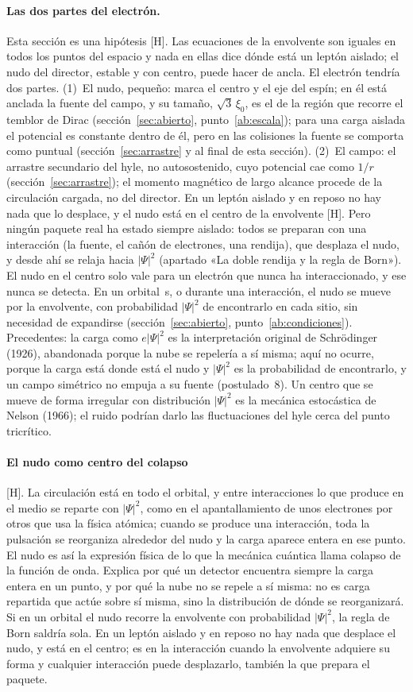 \documentclass[11pt,a4paper]{article}
\newcommand{\st}[1]{\textup{[#1]}}
\newcommand{\apartado}[1]{\paragraph{#1}}
\begin{document}
\apartado{Las dos partes del electrón.} Esta sección es una hipótesis \st{H}. Las ecuaciones de la envolvente son iguales en todos los puntos del espacio y nada en ellas dice dónde está un leptón aislado; el nudo del director, estable y con centro, puede hacer de ancla. El electrón tendría dos partes. (1)~El nudo, pequeño: marca el centro y el eje del espín; en él está anclada la fuente del campo, y su tamaño, $\sqrt3\,\xi_0$, es el de la región que recorre el temblor de Dirac (sección~\ref{sec:abierto}, punto~\ref{ab:escala}); para una carga aislada el potencial es constante dentro de él, pero en las colisiones la fuente se comporta como puntual (sección~\ref{sec:arrastre} y al final de esta sección). (2)~El campo: el arrastre secundario del hyle, no autosostenido, cuyo potencial cae como $1/r$ (sección~\ref{sec:arrastre}); el momento magnético de largo alcance procede de la circulación cargada, no del director. En un leptón aislado y en reposo no hay nada que lo desplace, y el nudo está en el centro de la envolvente \st{H}. Pero ningún paquete real ha estado siempre aislado: todos se preparan con una interacción (la fuente, el cañón de electrones, una rendija), que desplaza el nudo, y desde ahí se relaja hacia $|\Psi|^2$ (apartado «La doble rendija y la regla de Born»). El nudo en el centro solo vale para un electrón que nunca ha interaccionado, y ese nunca se detecta. En un orbital~s, o durante una interacción, el nudo se mueve por la envolvente, con probabilidad $|\Psi|^2$ de encontrarlo en cada sitio, sin necesidad de expandirse (sección~\ref{sec:abierto}, punto~\ref{ab:condiciones}). Precedentes: la carga como $e|\Psi|^2$ es la interpretación original de Schrödinger (1926), abandonada porque la nube se repelería a sí misma; aquí no ocurre, porque la carga está donde está el nudo y $|\Psi|^2$ es la probabilidad de encontrarlo, y un campo simétrico no empuja a su fuente (postulado~8). Un centro que se mueve de forma irregular con distribución $|\Psi|^2$ es la mecánica estocástica de Nelson (1966); el ruido podrían darlo las fluctuaciones del hyle cerca del punto tricrítico.

\apartado{El nudo como centro del colapso} \st{H}. La circulación está en todo el orbital, y entre interacciones lo que produce en el medio se reparte con $|\Psi|^2$, como en el apantallamiento de unos electrones por otros que usa la física atómica; cuando se produce una interacción, toda la pulsación se reorganiza alrededor del nudo y la carga aparece entera en ese punto. El nudo es así la expresión física de lo que la mecánica cuántica llama colapso de la función de onda. Explica por qué un detector encuentra siempre la carga entera en un punto, y por qué la nube no se repele a sí misma: no es carga repartida que actúe sobre sí misma, sino la distribución de dónde se reorganizará. Si en un orbital el nudo recorre la envolvente con probabilidad $|\Psi|^2$, la regla de Born saldría sola. En un leptón aislado y en reposo no hay nada que desplace el nudo, y está en el centro; es en la interacción cuando la envolvente adquiere su forma y cualquier interacción puede desplazarlo, también la que prepara el paquete.
\end{document}

